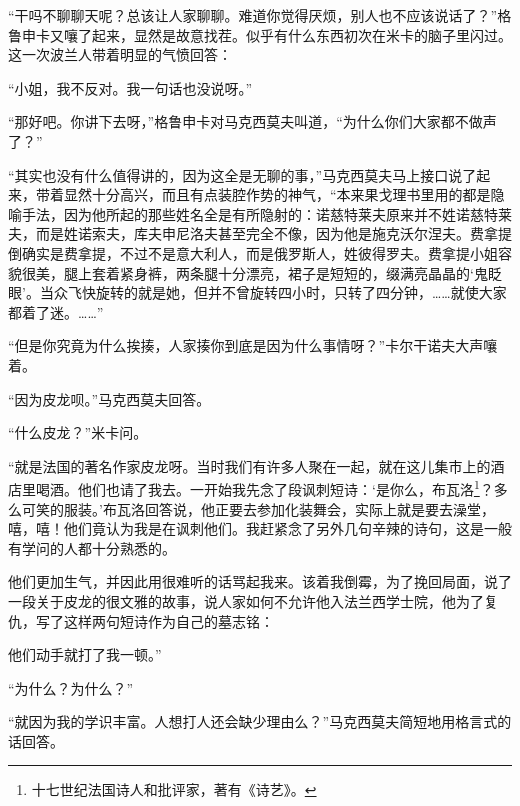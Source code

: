 \par “干吗不聊聊天呢？总该让人家聊聊。难道你觉得厌烦，别人也不应该说话了？”格鲁申卡又嚷了起来，显然是故意找茬。似乎有什么东西初次在米卡的脑子里闪过。这一次波兰人带着明显的气愤回答：
\par “小姐，我不反对。我一句话也没说呀。”
\par “那好吧。你讲下去呀，”格鲁申卡对马克西莫夫叫道，“为什么你们大家都不做声了？”
\par “其实也没有什么值得讲的，因为这全是无聊的事，”马克西莫夫马上接口说了起来，带着显然十分高兴，而且有点装腔作势的神气，“本来果戈理书里用的都是隐喻手法，因为他所起的那些姓名全是有所隐射的：诺慈特莱夫原来并不姓诺慈特莱夫，而是姓诺索夫，库夫申尼洛夫甚至完全不像，因为他是施克沃尔涅夫。费拿提倒确实是费拿提，不过不是意大利人，而是俄罗斯人，姓彼得罗夫。费拿提小姐容貌很美，腿上套着紧身裤，两条腿十分漂亮，裙子是短短的，缀满亮晶晶的‘鬼眨眼’。当众飞快旋转的就是她，但并不曾旋转四小时，只转了四分钟，……就使大家都着了迷。……”
\par “但是你究竟为什么挨揍，人家揍你到底是因为什么事情呀？”卡尔干诺夫大声嚷着。
\par “因为皮龙呗。”马克西莫夫回答。
\par “什么皮龙？”米卡问。
\par “就是法国的著名作家皮龙呀。当时我们有许多人聚在一起，就在这儿集市上的酒店里喝酒。他们也请了我去。一开始我先念了段讽刺短诗：‘是你么，布瓦洛\footnote{十七世纪法国诗人和批评家，著有《诗艺》。}？多么可笑的服装。’布瓦洛回答说，他正要去参加化装舞会，实际上就是要去澡堂，嘻，嘻！他们竟认为我是在讽刺他们。我赶紧念了另外几句辛辣的诗句，这是一般有学问的人都十分熟悉的。
\par 他们更加生气，并因此用很难听的话骂起我来。该着我倒霉，为了挽回局面，说了一段关于皮龙的很文雅的故事，说人家如何不允许他入法兰西学士院，他为了复仇，写了这样两句短诗作为自己的墓志铭：
\par 他们动手就打了我一顿。”
\par “为什么？为什么？”
\par “就因为我的学识丰富。人想打人还会缺少理由么？”马克西莫夫简短地用格言式的话回答。
